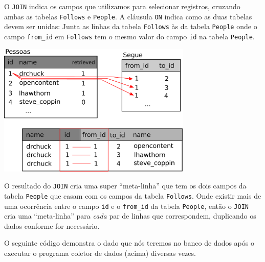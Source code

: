 %
O {\tt JOIN} indica os campos que utilizamos para selecionar registros, cruzando ambas
as tabelas {\tt Follows} e {\tt People}. A cláusula {\tt ON} indica como as
duas tabelas devem ser unidas: Junta as linhas da tabela {\tt Follows} às da
tabela {\tt People} onde o campo \verb"from_id" em {\tt Follows} tem o mesmo
valor do campo {\tt id} na tabela {\tt People}.

\beforefig
\centerline{\includegraphics[height=2.50in]{figs2/join.eps}}
\afterfig


O resultado do {\tt JOIN} cria uma super ``meta-linha'' que tem os dois campos
da tabela {\tt People} que casam com os campos da tabela {\tt Follows}. Onde
existir mais de uma ocorrência entre o campo {\tt id} e o \verb"from_id" da
tabela {\tt People}, então o {\tt JOIN} cria uma ``meta-linha'' para \emph{cada}
par de linhas que correspondem, duplicando os dados conforme for necessário.


O seguinte código demonstra o dado que nós teremos no banco de dados após o
executar o programa coletor de dados (acima) diversas vezes.

